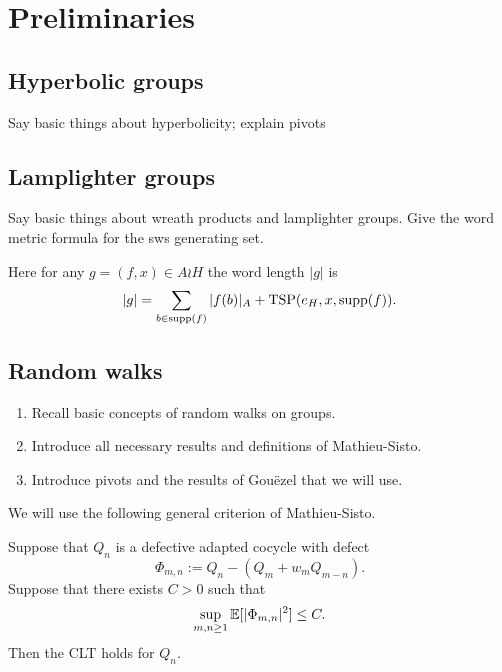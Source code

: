 \section{Preliminaries}

\subsection{Hyperbolic groups}
Say basic things about hyperbolicity; explain pivots

\subsection{Lamplighter groups}
Say basic things about wreath products and lamplighter groups. Give the word metric formula for the sws generating set.

Here for any $g=(f,x)\in A\wr H$ the word length $|g|$ is
\[
|g|= \sum_{b\in\mathrm{supp}(f)}|f(b)|_{A} + \mathrm{TSP}(e_H,x,\mathrm{supp}(f)).
\]

\subsection{Random walks}
\begin{enumerate}
	\item Recall basic concepts of random walks on groups.
	\item Introduce all necessary results and definitions of Mathieu-Sisto.
	\item Introduce pivots and the results of Gouëzel that we will use.
\end{enumerate}


We will use the following general criterion of Mathieu-Sisto.

\begin{defn}

\end{defn}

\begin{thm} \label{thm:generalCLT}
	Suppose that $Q_n$ is a defective adapted cocycle with defect
	\[
	\Phi_{m,n} := Q_n - (Q_m + w_m Q_{m-n}).
	\]
	Suppose that there exists $C>0$ such that  \[
	\sup_{m,n\ge 1}\mathbb{E}[|\Phi_{m,n}|^2] \le C.
	\]
	 Then the CLT holds for $Q_n$.
\end{thm}
